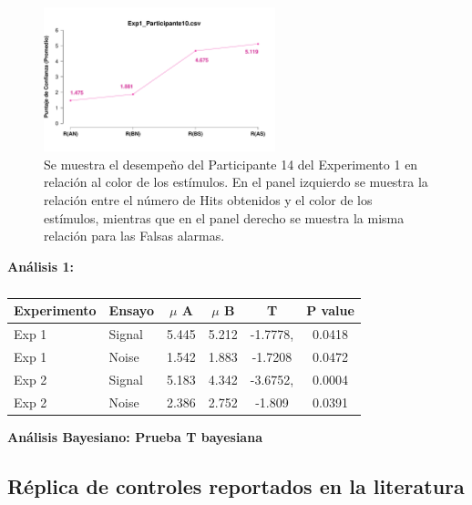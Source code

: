 \begin{figure}[th]
\centering
\includegraphics[width=0.60\textwidth]{Figures/MirrorRating_Exp1_P10}
\caption[Comparación entre Puntajes de Confianza asignados por Condición; Ejemplo]{Se muestra el desempeño del Participante 14 del Experimento 1 en relación al color de los estímulos. En el panel izquierdo se muestra la relación entre el número de Hits obtenidos y el color de los estímulos, mientras que en el panel derecho se muestra la misma relación para las Falsas alarmas.}
\label{fig:MirrorRating_E1_P10}
\end{figure}






\textbf{Análisis 1: }

\begin{table}
\caption[Prueba T para evaluar diferencias en las medias de los puntajes de confianza asigandos entre condiciones]{}
\label{Tabla_t-HitsyFA}
\centering
\begin{tabular}{l l |  c c c c}
\toprule
\textbf{Experimento} & \textbf{Ensayo} & \textbf{$\mu$ A} & \textbf{$\mu$ B} & \textbf{T} & \textbf{P value}\\
\midrule
Exp 1 & Signal & 5.445 & 5.212 & -1.7778, & 0.0418 \\
Exp 1 & Noise & 1.542 & 1.883 & -1.7208 & 0.0472 \\
Exp 2 & Signal & 5.183 & 4.342  & -3.6752, & 0.0004 \\
Exp 2 & Noise & 2.386 & 2.752 & -1.809 & 0.0391 \\
\bottomrule
\end{tabular}
\end{table}


\textbf{Análisis Bayesiano: Prueba T bayesiana }











\subsection{Réplica de controles reportados en la literatura}



